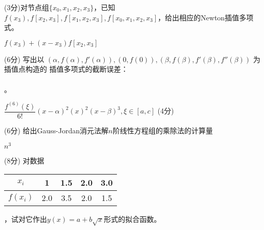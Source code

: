 \documentclass[12pt,letter]{ustcexam}
\begin{document}
\begin{CJK*}{UTF8}{song}
\begin{problems}
\qu (3分)对节点组$\{x_0,x_1,x_2,x_3\}$，已知$f(x_3),f[x_2,x_3],f[x_1,x_2,x_3],f[x_0,x_1,x_2,x_3]$，给出相应的Newton插值多项式\sixb\sixb 。~
\begin{sol}
 $f(x_3)+(x-x_3)f[x_2,x_3] $
\end{sol}


\qu (6分) 写出以 $ (\alpha,f(\alpha),f'(\alpha)),(0,f(0)),
(\beta,f(\beta),f'(\beta),f''(\beta)) $ 为插值点构造的
插值多项式的截断误差： \\ \\ \tenb\tenb\tenb 。
\begin{sol}
$\dfrac{f^{(6)}(\xi)}{6!}(x-\alpha)^2(x)^2(x-\beta)^3 , \xi\in[a,c]$ (4分)
\end{sol}

\qu (6分) 给出Gauss-Jordan消元法解$n$阶线性方程组的乘除法的计算量\sixb\sixb
\begin{sol}
$n^3$
\end{sol}

\newpage
{}



\qu (8分) 对数据 
\begin{tabular}{c|cccc} $x_i$  & 1 & 1.5 & 2.0 & 3.0
\\\hline $f(x_i)$ & 2.0 & 3.5 & 2.0 & 1.5
\end{tabular} ，试对它作出$y(x)=a +b \sqrt{x}$形式的拟合函数。


\end{problems}
\end{CJK*}
\end{document}
